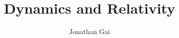 
\usepackage{pgfplots}
\pgfplotsset{compat=1.18}
\usepackage{bbm}
\usepackage{nicefrac}
\author{Jonathan Gai}
\title{Dynamics and Relativity}


\maketitle
\tableofcontents
{}
